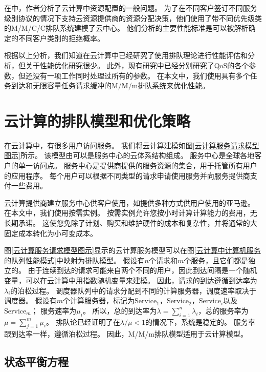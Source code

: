 \documentclass{morningstar}
\begin{document}
在\cite{key22}中，作者分析了云计算中资源配置的一般问题。
为了在不同客户签订不同服务级别协议的情况下支持云资源提供商的资源分配决策，他们使用了带不同优先级类的M/M/C/C排队系统建模了云中心。
他们分析的主要性能标准是可以被解析确定的不同客户类别的拒绝概率。
\par

根据以上分析，我们知道在云计算中已经研究了使用排队理论进行性能评估和分析，但关于性能优化研究很少。
此外，现有研究中已经分别研究了QoS的各个参数，但还没有一项工作同时处理过所有的参数。
在本文中，我们使用具有多个任务到达和无限容量任务请求缓冲的M/M/m排队系统来优化性能。

\section{云计算的排队模型和优化策略}



在云计算中，有很多用户访问服务。
我们将云计算建模如图\ref{云计算服务请求模型图示}所示。
该模型由可以是服务中心的云体系结构组成。
服务中心是全球各地客户的单一访问点。
服务中心是提供商提供的服务资源的集合，用于托管所有用户的应用程序。
每个用户可以根据不同类型的请求申请使用服务并向服务提供商支付一些费用。
\par

云计算提供商建立服务中心供客户使用，如提供多种方式供用户使用的亚马逊。
在本文中，我们使用按需实例。
按需实例允许您按小时计算计算能力的费用，无长期承诺。
这使您免除了计划、购买和维护硬件的成本和复杂性，并将通常的大固定成本转化为小可变成本\cite{key23}。
\par

图\ref{云计算服务请求模型图示}显示的云计算服务模型可以在图\ref{云计算中计算机服务的队列性能模式}中映射为排队模型。
假设有$n$个请求和$m$个服务，且它们都是独立的。
由于连续到达的请求可能来自两个不同的用户，因此到达间隔是一个随机变量，可以在云计算中用指数随机变量来建模。
因此，请求的到达遵循到达率为$\lambda_i$的泊松过程。
调度器队列中的请求分配到不同的计算服务器，调度速率取决于调度器。
假设有$m$个计算服务器，标记为$\text{Service}_1$，$\text{Service}_2$，$\text{Service}_i$以及$\text{Service}_m$；
服务速率为$\mu_i$。
所以，总的到达率为$\lambda = \sum_{i=1}^n \lambda_i$，总的服务率为$\mu = \sum_{j=1}^m \mu_i$。
排队论已经证明了在$\lambda / \mu < 1$的情况下，系统是稳定的。
服务率跟到达率一样，遵循泊松过程。
因此，M/M/m排队模型适用于云计算模型。



\subsection{状态平衡方程}

\end{document}
